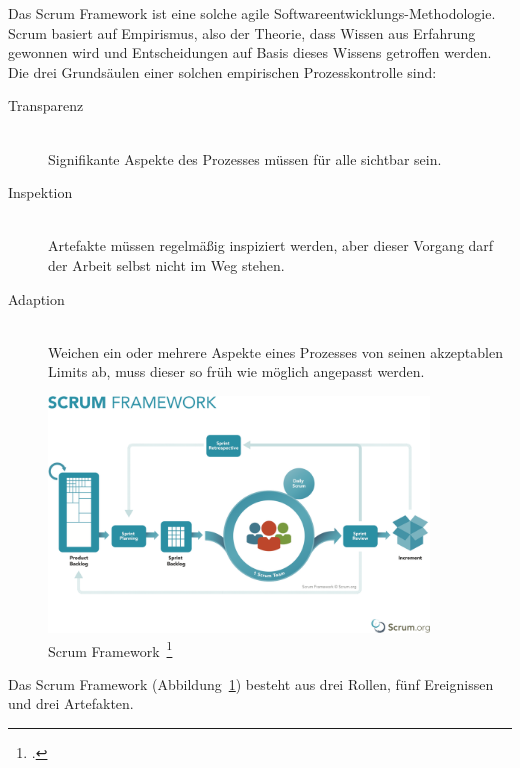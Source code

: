 Das Scrum Framework ist eine solche agile Softwareentwicklungs-Methodologie. 
Scrum basiert auf Empirismus, also der Theorie, dass Wissen aus Erfahrung gewonnen wird und Entscheidungen auf Basis dieses Wissens getroffen werden. 
Die drei Grundsäulen einer solchen empirischen Prozesskontrolle sind:

\begin{description}
  \item[Transparenz] \hfill \\ Signifikante Aspekte des Prozesses müssen für alle sichtbar sein.
  \item[Inspektion] \hfill \\ Artefakte müssen regelmäßig inspiziert werden, aber dieser Vorgang darf der Arbeit selbst nicht im Weg stehen.
  \item[Adaption] \hfill \\ Weichen ein oder mehrere Aspekte eines Prozesses von seinen akzeptablen Limits ab, muss dieser so früh wie möglich angepasst werden.
\end{description}

\begin{savenotes}
  \begin{figure}[H] 
    \centering
    \includegraphics[width=0.9\textwidth]{img/scrum-framework.png}
    \caption[Scrum Framework]{Scrum Framework~\footcite{scrum_framework}}\label{fig:scrum_framework}
  \end{figure}
\end{savenotes}

Das Scrum Framework (Abbildung~\ref{fig:scrum_framework}) besteht aus drei Rollen, fünf Ereignissen und drei Artefakten.

